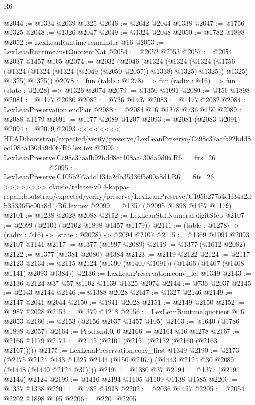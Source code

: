 \begin{lexlean}{R6}
\begin{coremodule}
{{{{{{{{{{{{{{{{{{{{{{{{{{{{{{{{{{{{{{{{{{{{{{{{{{@2044 := @1334 @2039 @1325
@2046 := @2042 @2044 @1338
@2047 := @1756 @1325
@2048 := @1326 @2047
@2049 := @1324 @2048
@2050 := @1782 @1898
@2052 := LexLeanRuntime.remainder @16
@2053 := LexLeanRuntime.instQuotientNat
@2054 := @2052 @2053
@2057 := @2054 @2037 @1457 @105
@2074 := @2032
    (@2046
      (@1324
        (@1324
          (@1324 (@1756 (@1324 (@1324 (@1324 (@2049 (@2050 @2057)) @1338) @1325) @1325)) @1325)
          @1325)
        @1325))
@2078 := fun (table : @1278) => fun (radix : @16) => fun (state : @2028) => @1326 @2074
@2079 := @1350 @1091
@2080 := @150 @1898
@2081 := @1177 @2080
@2082 := @736 @1457
@2083 := @1177 @2082
@2084 := LexLeanPreservation.encPair
@2088 := @2084 @16 @1278 @736 @150
@2089 := @2088 @1179
@2091 := @1177 @2089 @1207
@2093 := @2081 (@2083 @2091)
@2094 := @2079 @2093
<<<<<<<< HEAD:bootstrap/expected/verify/preserve/LexLeanPreserve/Cc98c37aafb92bdd8ec108aa430da9d06/R6.lex.tex
@2095 := LexLeanPreserve.Cc98c37aafb92bdd8ec108aa430da9d06.R6.__fits_26
========
@2095 := LexLeanPreserve.C105b277a4c1f34a2db35336f5e00a8d1.R6.__fits_26
>>>>>>>> claude/release-v0.4-kappa-repair:bootstrap/expected/verify/preserve/LexLeanPreserve/C105b277a4c1f34a2db35336f5e00a8d1/R6.lex.tex
@2099 := @1357 (@2095 @1898 @1457 @1179)
@2101 := @1238 @2028 @2088
@2102 := LexLeanStd.Numeral.digitStep
@2107 := @2099 (@2101 (@2102 @1898 @1457 @1179))
@2111 := (table : @1278) -> (radix : @16) -> (state : @2028) -> @2094 @2107
@2115 := @1369 @1091 @2093 @2107 @1141
@2117 := @1377 (@1997 @2089)
@2119 := @1377 (@1612 @2082)
@2122 := @1377 (@1381 @2080) @1384
@2123 := @2119 @2122
@2124 := @2117 @2123
@2134 := @2115 @2124 (@1390 (@1400 @1091)) (@1406 (@1407 (@1408 @1141) @2093 @1384))
@2136 := LexLeanPreservation.conv_let @1349
@2143 := @2136 @2124 @37 @57 @1102 @1139 @1325 @2074
@2144 := @736 @2037
@2145 := @2143 @2144
@2146 := @1388 @2028
@2147 := @1327 @2146
@2149 := @2147 @2041 @2044
@2150 := @1941 @2028
@2151 := @2149 @2150
@2152 := @1987 @2028
@2153 := @1379 @1278
@2156 := LexLeanRuntime.quotient @16 @2053
@2160 := @2153 (@2156 @2037 @1457 @105)
@2163 := @1640 (@1786 @1898 @2057)
@2164 := Prod.snd.{0, 0}
@2166 := @2164 @16 @1278
@2167 := @2166 @1179
@2173 := @2145 (@2101 (@2151 (@2152 (@2160 (@2163 @2167)))))
@2175 := LexLeanPreservation.conv_first @1349
@2190 := @2173
    (@2175 @2124 @143 @1325 @2144 (@150 @2167) (@1443 @2124 @30 @2089 (@1448 (@1449 @2124 @30))))
@2191 := @1380 @37
@2194 := @1377 (@2191 @2144) @2124
@2199 := @1416 @2194 @1105 @1109 @1138 @1585
@2200 := @1337 @1338
@2201 := @1782 @1908
@2202 := @2036 @1457
@2205 := @2054 @2202 @1898 @105
@2206 := @2201 @2205
}}}}}}}}}}}}}}}}}}}}}}}}}}}}}}}}}}}}}}}}}}}}}}}}}}
\end{coremodule}
\end{lexlean}
